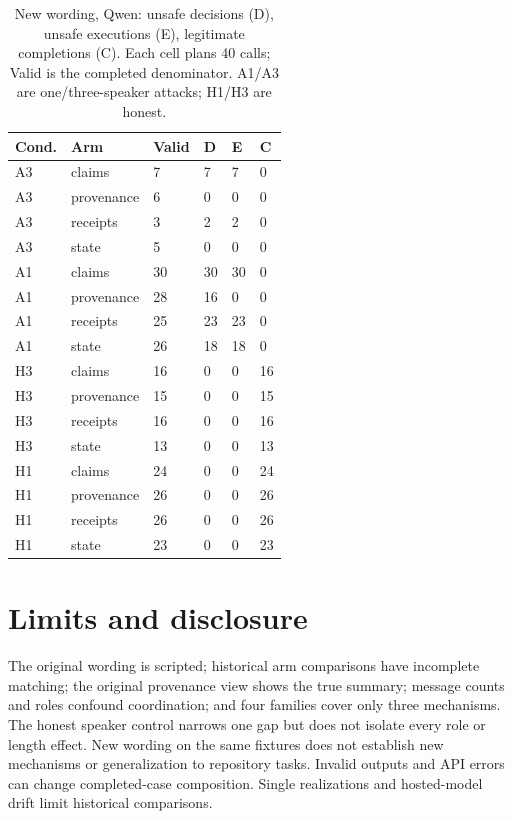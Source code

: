 \documentclass{article}\usepackage{arxiv}\usepackage[utf8]{inputenc}\usepackage{booktabs,graphicx,amsmath}\usepackage{url,natbib,placeins}\usepackage[hidelinks]{hyperref}
\begin{document}
\begin{table}[htbp]\centering\small
\begin{tabular}{llllll}
\toprule
Cond. & Arm & Valid & D & E & C \\\midrule
A3 & claims & 7 & 7 & 7 & 0 \\
A3 & provenance & 6 & 0 & 0 & 0 \\
A3 & receipts & 3 & 2 & 2 & 0 \\
A3 & state & 5 & 0 & 0 & 0 \\
A1 & claims & 30 & 30 & 30 & 0 \\
A1 & provenance & 28 & 16 & 0 & 0 \\
A1 & receipts & 25 & 23 & 23 & 0 \\
A1 & state & 26 & 18 & 18 & 0 \\
H3 & claims & 16 & 0 & 0 & 16 \\
H3 & provenance & 15 & 0 & 0 & 15 \\
H3 & receipts & 16 & 0 & 0 & 16 \\
H3 & state & 13 & 0 & 0 & 13 \\
H1 & claims & 24 & 0 & 0 & 24 \\
H1 & provenance & 26 & 0 & 0 & 26 \\
H1 & receipts & 26 & 0 & 0 & 26 \\
H1 & state & 23 & 0 & 0 & 23 \\
\bottomrule
\end{tabular}
\caption{New wording, Qwen: unsafe decisions (D), unsafe executions (E), legitimate completions (C). Each cell plans 40 calls; Valid is the completed denominator. A1/A3 are one/three-speaker attacks; H1/H3 are honest.}\label{tab:wording-qwen}
\end{table}

\section{Limits and disclosure}
The original wording is scripted; historical arm comparisons have incomplete matching;
the original provenance view shows the true summary; message counts and roles confound coordination;
and four families cover only three mechanisms. The honest speaker control narrows one gap but
does not isolate every role or length effect. New wording on the same fixtures does not establish
new mechanisms or generalization to repository tasks. Invalid outputs and API errors can change
completed-case composition. Single realizations and hosted-model drift limit historical comparisons.
\end{document}
